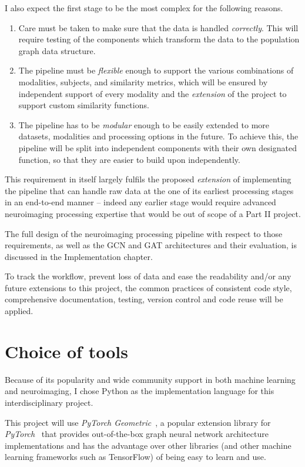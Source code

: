 I also expect the first stage to be the most complex for the following reasons.
\begin{enumerate}
    \item Care must be taken to make sure that the data is handled \textit{correctly}. This will require testing of the components which transform the data to the population graph data structure.
    \item The pipeline must be \textit{flexible} enough to support the various combinations of modalities, subjects, and similarity metrics, which will be ensured by independent support of every modality and the \textit{extension} of the project to support custom similarity functions.
    \item The pipeline has to be \textit{modular} enough to be easily extended to more datasets, modalities and processing options in the future. To achieve this, the pipeline will be split into independent components with their own designated function, so that they are easier to build upon independently.
\end{enumerate} 

This requirement in itself largely fulfils the proposed \textit{extension} of implementing the pipeline that can handle raw data at the one of its earliest processing stages in an end-to-end manner – indeed any earlier stage would require advanced neuroimaging processing expertise that would be out of scope of a Part II project. 

The full design of the neuroimaging processing pipeline with respect to those requirements, as well as the GCN and GAT architectures and their evaluation, is discussed in the Implementation chapter.

To track the workflow, prevent loss of data and ease the readability and/or any future extensions to this project, the common practices of consistent code style, comprehensive documentation, testing, version control and code reuse will be applied.

\section{Choice of tools}

Because of its popularity and wide community support in both machine learning and neuroimaging, I chose Python as the implementation language for this interdisciplinary project.

This project will use \textit{PyTorch Geometric}~\cite{fey2019pytorch}, a popular extension library for \textit{PyTorch}~\cite{pytorch} that provides out-of-the-box graph neural network architecture implementations and has the advantage over other libraries (and other machine learning frameworks such as TensorFlow) of being easy to learn and use. 

